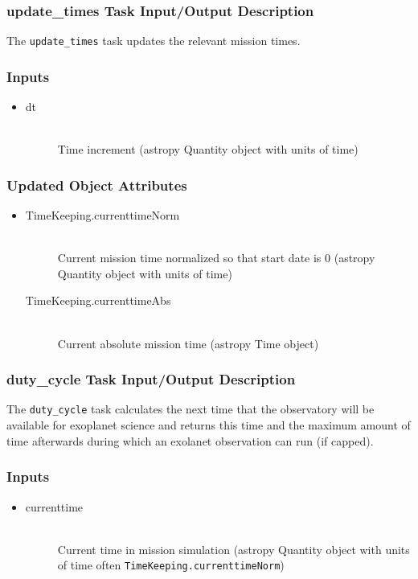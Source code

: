 \documentclass[cleanfoot]{asme2ej}
\begin{document}
\subsubsection{update\_times Task Input/Output Description} \label{sec:updatetimestask}
The \verb+update_times+ task updates the relevant mission times.

\subsubsection*{Inputs}
\begin{itemize}
    \item 
    \begin{description}
        \item[dt] \hfill \\
        Time increment (astropy Quantity object with units of time)
    \end{description}
\end{itemize}

\subsubsection*{Updated Object Attributes}
\begin{itemize}
    \item 
    \begin{description}
        \item[TimeKeeping.currenttimeNorm] \hfill \\
        Current mission time normalized so that start date is 0 (astropy Quantity object with units of time)
        \item[TimeKeeping.currenttimeAbs] \hfill \\
        Current absolute mission time (astropy Time object)
    \end{description}
\end{itemize}

\subsubsection{duty\_cycle Task Input/Output Description} \label{sec:dutycycletask}
The \verb+duty_cycle+ task calculates the next time that the observatory will be available for exoplanet science and returns this time and the maximum amount of time afterwards during which an exolanet observation can run (if capped).

\subsubsection*{Inputs}
\begin{itemize}
    \item 
    \begin{description}
        \item[currenttime] \hfill \\
        Current time in mission simulation (astropy Quantity object with units of time often \verb+TimeKeeping.currenttimeNorm+)
    \end{description}
\end{itemize}
\end{document}
